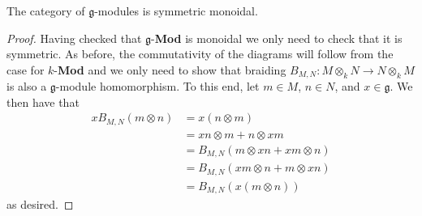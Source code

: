 \begin{lemma}
  The category of $ \mathfrak{g} $-modules is symmetric monoidal.
\end{lemma}
\begin{proof}
  Having checked that $ \mathfrak{g} $-\textbf{Mod} is monoidal we only need to check that it is symmetric. As before, the commutativity of the diagrams will follow from the case for $ k $-\textbf{Mod} and we only need to show that braiding $ B_{M, N}: M \otimes_k N \to N \otimes_k M $ is also a $ \mathfrak{g} $-module homomorphism. To this end, let $ m \in M $, $ n \in N $, and $ x \in \mathfrak{g} $. We then have that
  \begin{align*}
    xB_{M, N}(m \otimes n) &= x(n \otimes m) \\
                    &= xn \otimes m + n \otimes xm \\
                    &= B_{M, N}(m \otimes xn + xm \otimes n) \\
                    &= B_{M, N}(xm \otimes n + m \otimes xn) \\
                    &= B_{M, N}(x(m \otimes n))
  \end{align*}
  as desired.
\end{proof}

